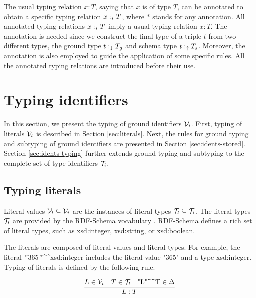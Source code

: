 \documentclass[runningheads]{llncs}
\newcommand{\darr}{\downarrow}
\newcommand{\uarr}{\uparrow}
\newcommand{\V}{{\cal V}}
\newcommand{\TT}{{\cal T}}
\begin{document}
The usual typing relation $x:T$, saying that $x$ is of type $T$, can
be annotated to obtain a specific typing relation $x:_*\/T$, where $*$
stands for any annotation. All annotated typing relations $x:_*\/T$
imply a usual typing relation $x:T$. The annotation is needed since we
construct the final type of a triple $t$ from two different types, the
ground type $t:_\darr\/T_g$ and schema type $t:_\uarr\/T_s$. Moreover,
the annotation is also employed to guide the application of
some specific rules. All the annotated typing relations are introduced
before their use.









\section{Typing identifiers\label{sec:typ-idents}}

In this section, we present the typing of ground identifiers
$\V_i$. First, typing of literals $\V_l$ is described in Section
\ref{sec:literals}. Next, the rules for ground typing and subtyping of
ground identifiers are presented in Section
\ref{sec:idents-stored}. Section \ref{sec:idents-typing} further
extends ground typing and subtyping to the complete set of type
identifiers $\TT_i$.





\subsection{Typing literals\label{sec:literals}}

Literal values $\V_l\subseteq\V_i$ are the instances of literal types
$\TT_l\subseteq\TT_i$. The literal types $\TT_l$ are provided by the
RDF-Schema vocabulary \cite{rdfschema}. RDF-Schema defines a rich set
of literal types, such as xsd:integer, xsd:string, or xsd:boolean.

The literals are composed of literal values and literal types. For
example, the literal
$"$365$"$\textasciicircum\textasciicircum\/xsd:integer includes the
literal value "365" and a type xsd:integer. Typing of literals is
defined by the following rule.

\begin{equation}
\dfrac{L\in\V_l\quad T\in\TT_l\quad \text{"L"\textasciicircum\textasciicircum\/T}\in\Delta}
      {L:T}  
\end{equation}
\end{document}

